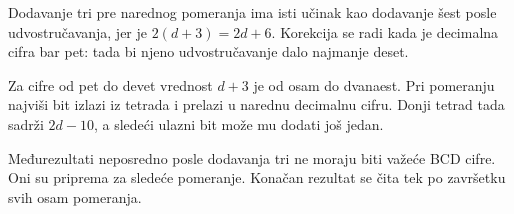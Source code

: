 Dodavanje tri pre narednog pomeranja ima isti učinak kao dodavanje šest posle udvostručavanja, jer je $2(d+3)=2d+6$. Korekcija se radi kada je decimalna cifra bar pet: tada bi njeno udvostručavanje dalo najmanje deset.

Za cifre od pet do devet vrednost $d+3$ je od osam do dvanaest. Pri pomeranju najviši bit izlazi iz tetrada i prelazi u narednu decimalnu cifru. Donji tetrad tada sadrži $2d-10$, a sledeći ulazni bit može mu dodati još jedan.

Međurezultati neposredno posle dodavanja tri ne moraju biti važeće BCD cifre. Oni su priprema za sledeće pomeranje. Konačan rezultat se čita tek po završetku svih osam pomeranja.
